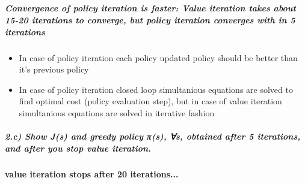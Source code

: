 \documentclass[11pt]{article}
\providecommand{\tightlist}{%
      \setlength{\itemsep}{0pt}\setlength{\parskip}{0pt}}
\begin{document}
    \begin{center}
    \end{center}
    { \hspace*{\fill} \\}
    
    \begin{center}
    \end{center}
    { \hspace*{\fill} \\}
    
    \begin{center}
    \end{center}
    { \hspace*{\fill} \\}
    
    \subparagraph{Convergence of policy iteration is faster: Value iteration
takes about 15-20 iterations to converge, but policy iteration converges
with in 5
iterations}\label{convergence-of-policy-iteration-is-faster-value-iteration-takes-about-15-20-iterations-to-converge-but-policy-iteration-converges-with-in-5-iterations}

\begin{itemize}
\tightlist
\item
  In case of policy iteration each policy updated policy should be
  better than it's previous policy
\item
  In case of policy iteration closed loop simultanious equations are
  solved to find optimal cost (policy evaluation step), but in case of
  value iteration simultanious equations are solved in iterative fashion
\end{itemize}

    \subparagraph{2.c) Show J(s) and greedy policy π(s), ∀s, obtained after
5 iterations, and after you stop value
iteration.}\label{c-show-js-and-greedy-policy-ux3c0s-s-obtained-after-5-iterations-and-after-you-stop-value-iteration.}

\paragraph{value iteration stops after 20
iterations...}\label{value-iteration-stops-after-20-iterations...}
\end{document}
